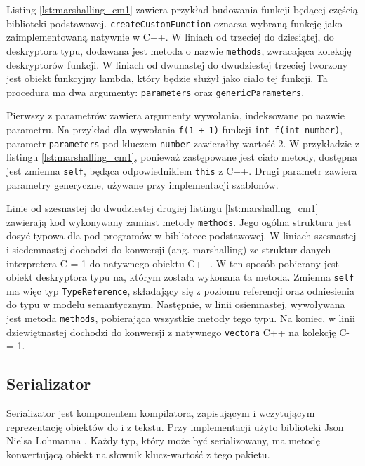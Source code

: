 Listing \ref{lst:marshalling_cm1} zawiera przykład budowania funkcji będącej częścią biblioteki podstawowej.
\lstinline{createCustomFunction} oznacza wybraną  funkcję jako zaimplementowaną natywnie w C++.
W liniach od trzeciej do dziesiątej, do deskryptora typu, dodawana jest metoda o nazwie \lstinline{methods}, zwracająca kolekcję deskryptorów funkcji.
W liniach od dwunastej do dwudziestej trzeciej tworzony jest obiekt funkcyjny lambda, który będzie służył jako ciało tej funkcji.
Ta procedura ma dwa argumenty: \lstinline{parameters} oraz \lstinline{genericParameters}.

Pierwszy z parametrów zawiera argumenty wywołania, indeksowane po nazwie parametru.
Na przykład dla wywołania \lstinline{f(1 + 1)} funkcji \lstinline{int f(int number)}, parametr \lstinline{parameters} pod kluczem \lstinline{number} zawierałby wartość 2.
W przykładzie z listingu \ref{lst:marshalling_cm1}, ponieważ zastępowane jest ciało metody, dostępna jest zmienna \lstinline{self}, będąca odpowiednikiem \lstinline{this} z C++.
Drugi parametr zawiera parametry generyczne, używane przy implementacji szablonów.

Linie od szesnastej do dwudziestej drugiej listingu \ref{lst:marshalling_cm1} zawierają kod wykonywany zamiast metody \lstinline{methods}.
Jego ogólna struktura jest dosyć typowa dla pod-programów w bibliotece podstawowej.
W liniach szesnastej i siedemnastej dochodzi do konwersji (ang. marshalling)\cite{wiki:Marshalling} ze struktur danych interpretera C-=-1 do natywnego obiektu C++.
W ten sposób pobierany jest obiekt deskryptora typu na, którym została wykonana ta metoda.
Zmienna \lstinline{self} ma więc typ \lstinline{TypeReference}, składający się z poziomu referencji oraz odniesienia do typu w modelu semantycznym.
Następnie, w linii osiemnastej, wywoływana jest metoda \lstinline{methods}, pobierająca wszystkie metody tego typu.
Na koniec, w linii dziewiętnastej dochodzi do konwersji z natywnego \lstinline{vectora} C++ na kolekcję C-=-1.


\subsection{Serializator}
\label{serializer}

Serializator jest komponentem kompilatora, zapisującym i wczytującym reprezentację obiektów do i z tekstu.
Przy implementacji użyto biblioteki Json Nielsa Lohmanna \cite{lohmann}.
Każdy typ, który może być serializowany, ma metodę konwertującą obiekt na słownik klucz-wartość z tego pakietu.

